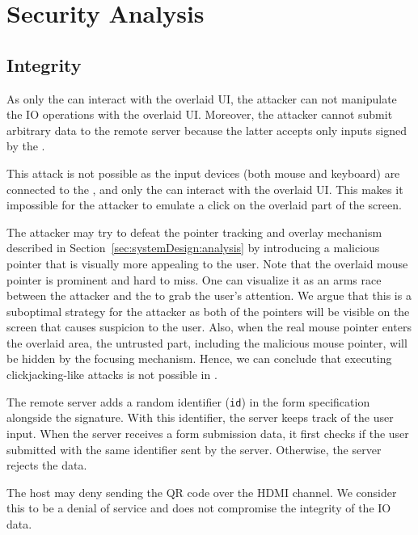 \section{Security Analysis}
\label{sec:securityAnalysis}

\subsection{Integrity}
\label{sec:securityAnalysis:integrity}


\parasave
{} As only the \device can interact with the overlaid UI, the attacker can not manipulate the IO operations with the overlaid UI. Moreover, the attacker cannot submit arbitrary data to the remote server because the latter accepts only inputs signed by the \device.

\parasave
{} This attack is not possible as the input devices (both mouse and keyboard) are connected to the \device, and only the \device can interact with the overlaid UI. This makes it impossible for the attacker to emulate a click on the overlaid part of the screen.  

\parasave
{} 
The attacker may try to defeat the \name pointer tracking and overlay mechanism described in Section~\ref{sec:systemDesign:analysis} by introducing a malicious pointer that is visually more appealing to the user. Note that the \device overlaid mouse pointer is prominent and hard to miss. One can visualize it as an arms race between the attacker and the \device to grab the user's attention. We argue that this is a suboptimal strategy for the attacker as both of the pointers will be visible on the screen that causes suspicion to the user. Also, when the real mouse pointer enters the overlaid area, the untrusted part, including the malicious mouse pointer, will be hidden by the focusing mechanism. Hence, we can conclude that executing clickjacking-like attacks is not possible in \name.

\parasave
{} The remote server adds a random identifier (\texttt{id}) in the form specification alongside the signature. With this identifier, the server keeps track of the user input. When the server receives a form submission data, it first checks if the user submitted with the same identifier sent by the server. Otherwise, the server rejects the data. 

\parasave
{} The host may deny sending the QR code over the HDMI channel. We consider this to be a denial of service and does not compromise the integrity of the IO data. 

